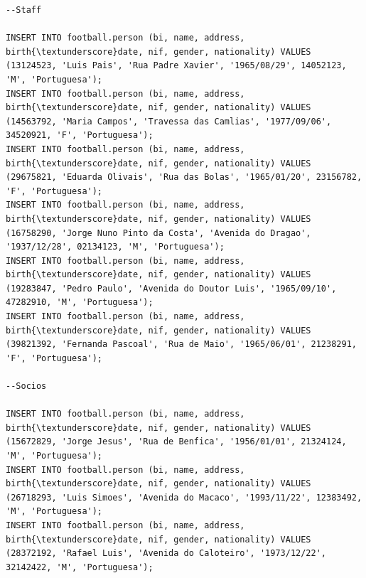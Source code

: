 \documentclass[pdftex,12pt,a4paper]{report}
\begin{document}
\begin{lstlisting}
--Staff

INSERT INTO football.person (bi, name, address, birth{\textunderscore}date, nif, gender, nationality) VALUES (13124523, 'Luis Pais', 'Rua Padre Xavier', '1965/08/29', 14052123, 'M', 'Portuguesa'); 
INSERT INTO football.person (bi, name, address, birth{\textunderscore}date, nif, gender, nationality) VALUES (14563792, 'Maria Campos', 'Travessa das Camlias', '1977/09/06', 34520921, 'F', 'Portuguesa');
INSERT INTO football.person (bi, name, address, birth{\textunderscore}date, nif, gender, nationality) VALUES (29675821, 'Eduarda Olivais', 'Rua das Bolas', '1965/01/20', 23156782, 'F', 'Portuguesa'); 
INSERT INTO football.person (bi, name, address, birth{\textunderscore}date, nif, gender, nationality) VALUES (16758290, 'Jorge Nuno Pinto da Costa', 'Avenida do Dragao', '1937/12/28', 02134123, 'M', 'Portuguesa'); 
INSERT INTO football.person (bi, name, address, birth{\textunderscore}date, nif, gender, nationality) VALUES (19283847, 'Pedro Paulo', 'Avenida do Doutor Luis', '1965/09/10', 47282910, 'M', 'Portuguesa');
INSERT INTO football.person (bi, name, address, birth{\textunderscore}date, nif, gender, nationality) VALUES (39821392, 'Fernanda Pascoal', 'Rua de Maio', '1965/06/01', 21238291, 'F', 'Portuguesa');

--Socios

INSERT INTO football.person (bi, name, address, birth{\textunderscore}date, nif, gender, nationality) VALUES (15672829, 'Jorge Jesus', 'Rua de Benfica', '1956/01/01', 21324124, 'M', 'Portuguesa'); 
INSERT INTO football.person (bi, name, address, birth{\textunderscore}date, nif, gender, nationality) VALUES (26718293, 'Luis Simoes', 'Avenida do Macaco', '1993/11/22', 12383492, 'M', 'Portuguesa'); 
INSERT INTO football.person (bi, name, address, birth{\textunderscore}date, nif, gender, nationality) VALUES (28372192, 'Rafael Luis', 'Avenida do Caloteiro', '1973/12/22', 32142422, 'M', 'Portuguesa');





\end{lstlisting}
\end{document}
